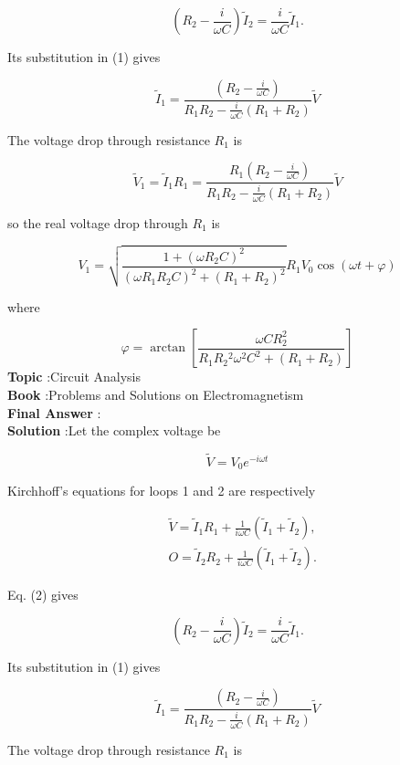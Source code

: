 \documentclass[10pt]{article}
\begin{document}
$$
\left(R_{2}-\frac{i}{\omega C}\right) \tilde{I}_{2}=\frac{i}{\omega C} \tilde{I}_{1} .
$$

Its substitution in (1) gives

$$
\tilde{I}_{1}=\frac{\left(R_{2}-\frac{i}{\omega C}\right)}{R_{1} R_{2}-\frac{i}{\omega C}\left(R_{1}+R_{2}\right)} \tilde{V}
$$

The voltage drop through resistance $R_{1}$ is

$$
\tilde{V}_{1}=\tilde{I}_{1} R_{1}=\frac{R_{1}\left(R_{2}-\frac{i}{\omega C}\right)}{R_{1} R_{2}-\frac{i}{\omega C}\left(R_{1}+R_{2}\right)} \tilde{V}
$$

so the real voltage drop through $R_{1}$ is

$$
V_{1}=\sqrt{\frac{1+\left(\omega R_{2} C\right)^{2}}{\left(\omega R_{1} R_{2} C\right)^{2}+\left(R_{1}+R_{2}\right)^{2}}} R_{1} V_{0} \cos (\omega t+\varphi)
$$

where

$$
\varphi=\arctan \left[\frac{\omega C R_{2}^{2}}{R_{1} R_{2}{ }^{2} \omega^{2} C^{2}+\left(R_{1}+R_{2}\right)}\right]
$$
\textbf{Topic} :Circuit Analysis\\
\textbf{Book} :Problems and Solutions on Electromagnetism\\
\textbf{Final Answer} :\arctan {}\\


\textbf{Solution} :Let the complex voltage be

$$
\tilde{V}=V_{0} e^{-i \omega t}
$$

Kirchhoff's equations for loops 1 and 2 are respectively

$$
\begin{aligned}
&\tilde{V}=\tilde{I}_{1} R_{1}+\frac{1}{i \omega C}\left(\tilde{I}_{1}+\tilde{I}_{2}\right), \\
&O=\tilde{I}_{2} R_{2}+\frac{1}{i \omega C}\left(\tilde{I}_{1}+\tilde{I}_{2}\right) .
\end{aligned}
$$

Eq.
(2) gives

$$
\left(R_{2}-\frac{i}{\omega C}\right) \tilde{I}_{2}=\frac{i}{\omega C} \tilde{I}_{1} .
$$

Its substitution in (1) gives

$$
\tilde{I}_{1}=\frac{\left(R_{2}-\frac{i}{\omega C}\right)}{R_{1} R_{2}-\frac{i}{\omega C}\left(R_{1}+R_{2}\right)} \tilde{V}
$$

The voltage drop through resistance $R_{1}$ is
\end{document}
